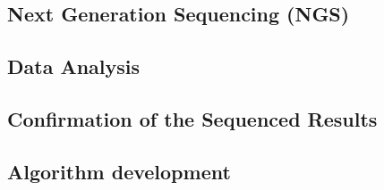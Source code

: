 


\subsection{Next Generation Sequencing (NGS)}


\subsection{Data Analysis}



\subsection{Confirmation of the Sequenced Results}


\subsection{Algorithm development}



